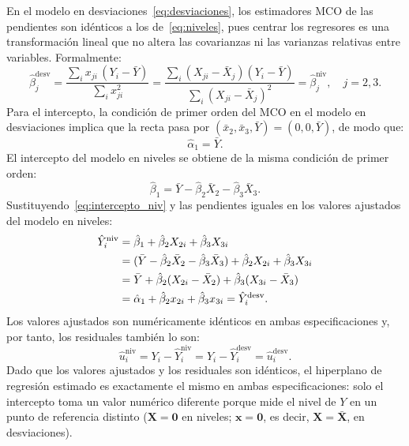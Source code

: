 \documentclass[12pt, letterpaper]{article}
\begin{document}
En el modelo en desviaciones~\eqref{eq:desviaciones}, los estimadores
MCO de las pendientes son idénticos a los de~\eqref{eq:niveles}, pues
centrar los regresores es una transformación lineal que no altera las
covarianzas ni las varianzas relativas entre variables. Formalmente:
\begin{equation}
  \hat{\beta}_j^{\text{desv}}
  = \frac{\sum_i x_{ji}\,(Y_i - \bar{Y})}{\sum_i x_{ji}^2}
  = \frac{\sum_i (X_{ji} - \bar{X}_j)(Y_i - \bar{Y})}
         {\sum_i (X_{ji} - \bar{X}_j)^2}
  = \hat{\beta}_j^{\text{niv}}, \quad j = 2, 3.
  \label{eq:igualdad_pendientes}
\end{equation}
Para el intercepto, la condición de primer orden del MCO en el modelo
en desviaciones implica que la recta pasa por $(\bar{x}_2, \bar{x}_3, \bar{Y})
= (0, 0, \bar{Y})$, de modo que:
\begin{equation}
  \hat{\alpha}_1 = \bar{Y}.
  \label{eq:intercepto_desv}
\end{equation}
El intercepto del modelo en niveles se obtiene de la misma condición de
primer orden:
\begin{equation}
  \hat{\beta}_1 = \bar{Y} - \hat{\beta}_2\bar{X}_2 - \hat{\beta}_3\bar{X}_3.
  \label{eq:intercepto_niv}
\end{equation}
Sustituyendo~\eqref{eq:intercepto_niv} y las pendientes iguales en los
valores ajustados del modelo en niveles:
\begin{align}
  \hat{Y}_i^{\text{niv}}
  &= \hat{\beta}_1 + \hat{\beta}_2 X_{2i} + \hat{\beta}_3 X_{3i} \notag\\
  &= (\bar{Y} - \hat{\beta}_2\bar{X}_2 - \hat{\beta}_3\bar{X}_3)
     + \hat{\beta}_2 X_{2i} + \hat{\beta}_3 X_{3i} \notag\\
  &= \bar{Y} + \hat{\beta}_2(X_{2i} - \bar{X}_2)
             + \hat{\beta}_3(X_{3i} - \bar{X}_3) \notag\\
  &= \hat{\alpha}_1 + \hat{\beta}_2 x_{2i} + \hat{\beta}_3 x_{3i}
   = \hat{Y}_i^{\text{desv}}.
  \label{eq:igualdad_yhat}
\end{align}
Los valores ajustados son numéricamente idénticos en ambas
especificaciones y, por tanto, los residuales también lo son:
\begin{equation}
  \hat{u}_i^{\text{niv}} = Y_i - \hat{Y}_i^{\text{niv}}
  = Y_i - \hat{Y}_i^{\text{desv}}
  = \hat{u}_i^{\text{desv}}.
  \label{eq:igualdad_residuales}
\end{equation}
Dado que los valores ajustados y los residuales son idénticos, el
hiperplano de regresión estimado es exactamente el mismo en ambas
especificaciones: solo el intercepto toma un valor numérico diferente
porque mide el nivel de $Y$ en un punto de referencia distinto
($\mathbf{X} = \mathbf{0}$ en niveles; $\mathbf{x} = \mathbf{0}$,
es decir, $\mathbf{X} = \bar{\mathbf{X}}$, en desviaciones).
\end{document}
